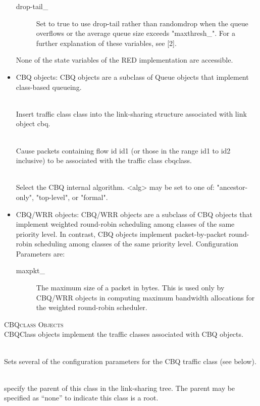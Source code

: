 \begin{itemize}
\begin{description}
\item[drop-tail\_]
Set to true to use drop-tail rather than randomdrop when the queue
overflows or the average queue size exceeds "maxthresh\_". For a further
explanation of these variables, see [2]. 
\end{description}
None of the state variables of the RED implementation are accessible. 


\item CBQ objects:
CBQ objects are a subclass of Queue objects that implement class-based
queueing. 

\\
Insert traffic class class into the link-sharing structure associated with
link object cbq. 

\\
Cause packets containing flow id id1 (or those in the range id1 to
id2 inclusive) to be associated with the traffic class cbqclass. 

\\
Select the CBQ internal algorithm. <alg> may be set to one of:
"ancestor-only", "top-level", or "formal". 


\item CBQ/WRR objects:
CBQ/WRR objects are a subclass of CBQ objects that implement weighted
round-robin scheduling among classes of the same priority level. In
contrast, CBQ objects implement packet-by-packet round-robin scheduling
among classes of the same priority level. Configuration Parameters are:
\begin{description}
\item[maxpkt\_] The maximum size of a packet in bytes. This is used only
by CBQ/WRR objects in computing maximum bandwidth allocations for the
weighted round-robin scheduler. 
\end{description}
\end{itemize}


\textsc{CBQclass Objects}\\
CBQClass objects implement the traffic classes associated with CBQ
objects. 

\\
Sets several of the configuration parameters for the CBQ traffic class
(see below). 

\\
specify the parent of this class in the link-sharing tree. The parent may
be specified as ``none'' to indicate this class is a root. 

